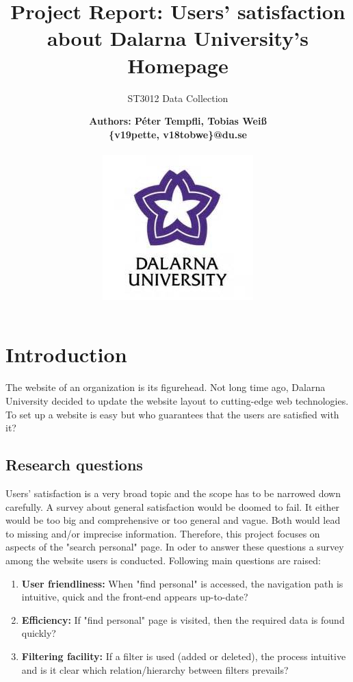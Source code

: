 \documentclass[12pt,a4paper,paper=a4,oneside,titlepage,pdftex]{scrartcl}
\begin{document}
	

\title{Project Report: Users' satisfaction about Dalarna University's Homepage}
\subtitle{ST3012 Data Collection}
\author{
	\bfseries\Large Authors: Péter Tempfli, Tobias Weiß\\
	\{v19pette, v18tobwe\}@du.se
	\\ \\
	\includegraphics[]{figures/du-logo.jpg}\\
}

\maketitle
\tableofcontents
\newpage

\section{Introduction}
The website of an organization is its figurehead. Not long time ago, Dalarna University decided to update the website layout to cutting-edge web technologies. To set up a website is easy but who guarantees that the users are satisfied with it?

\subsection{Research questions}
Users' satisfaction is a very broad topic and the scope has to be narrowed down carefully. A survey about general satisfaction would be doomed to fail. It either would be too big and comprehensive or too general and vague. Both would lead to missing and/or imprecise information. Therefore, this project focuses on aspects of the "search personal" page. In oder to answer these questions a survey among the website users is conducted. Following main questions are raised:

\begin{enumerate}
	\item \textbf{User friendliness:} When "find personal" is accessed, the navigation path is intuitive, quick and the front-end appears up-to-date?
	\item \textbf{Efficiency:} If "find personal" page is visited, then the required data is found quickly?
	\item \textbf{Filtering facility:} If a filter is used (added or deleted), the process intuitive and is it clear which relation/hierarchy between filters prevails?
\end{enumerate}
\end{document}
